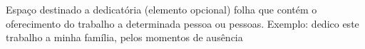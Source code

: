 \begin{dedicatoria}  
   \vspace*{\fill} %
    \hspace{.45\textwidth} %
    \begin{minipage}{.47\textwidth}
        \SingleSpacing %
        \raggedleft
        \sloppy %
        
        Espaço destinado a dedicatória (elemento opcional)
        folha que contém o oferecimento do trabalho a determinada pessoa ou pessoas.
        Exemplo: dedico este trabalho a minha família, pelos momentos de ausência  

    \end{minipage}


\end{dedicatoria}